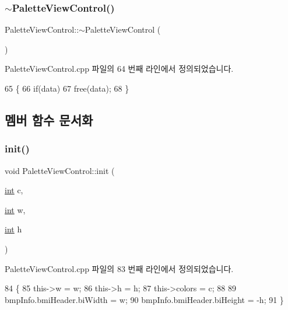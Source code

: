 \subsubsection{\texorpdfstring{$\sim$\+Palette\+View\+Control()}{~PaletteViewControl()}}
{\footnotesize\ttfamily Palette\+View\+Control\+::$\sim$\+Palette\+View\+Control (\begin{DoxyParamCaption}{ }\end{DoxyParamCaption})\hspace{0.3cm}{\ttfamily [virtual]}}



Palette\+View\+Control.\+cpp 파일의 64 번째 라인에서 정의되었습니다.


\begin{DoxyCode}
65 \{
66   \textcolor{keywordflow}{if}(data)
67     free(data);
68 \}
\end{DoxyCode}


\subsection{멤버 함수 문서화}
\mbox{\label{class_palette_view_control_abc7a9dd832f6b5fc8ca81c8b08bd2ee8}} 
\subsubsection{\texorpdfstring{init()}{init()}}
{\footnotesize\ttfamily void Palette\+View\+Control\+::init (\begin{DoxyParamCaption}\item[{\mbox{\hyperlink{_util_8cpp_a0ef32aa8672df19503a49fab2d0c8071}{int}}}]{c,  }\item[{\mbox{\hyperlink{_util_8cpp_a0ef32aa8672df19503a49fab2d0c8071}{int}}}]{w,  }\item[{\mbox{\hyperlink{_util_8cpp_a0ef32aa8672df19503a49fab2d0c8071}{int}}}]{h }\end{DoxyParamCaption})}



Palette\+View\+Control.\+cpp 파일의 83 번째 라인에서 정의되었습니다.


\begin{DoxyCode}
84 \{
85   this->w = w;
86   this->h = h;
87   this->colors = c;
88 
89   bmpInfo.bmiHeader.biWidth = w;
90   bmpInfo.bmiHeader.biHeight = -h;  
91 \}
\end{DoxyCode}
\mbox{\label{class_palette_view_control_ac2086b2ba7161f3adb5ac76484f77cc9}} 
